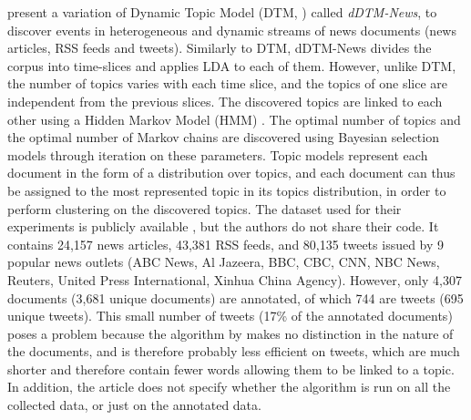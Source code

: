\cite{mele_linking_2017, mele2019event} present a variation of Dynamic Topic Model  (DTM, \citep{blei_dynamic_2006}) called \textit{dDTM-News}, to discover events in heterogeneous and dynamic streams of news documents (news articles, RSS feeds and tweets). Similarly to DTM, dDTM-News divides the corpus into time-slices and applies LDA to each of them. However, unlike DTM, the number of topics varies with each time slice, and the topics of one slice are independent from the previous slices. The discovered topics are linked to each other using a Hidden Markov Model (HMM) \citep{rabiner1989tutorial}. The optimal number of topics and the optimal number of Markov chains are discovered using Bayesian selection models through iteration on these parameters. Topic models represent each document in the form of a distribution over topics, and each document can thus be assigned to the most represented topic in its topics distribution, in order to perform clustering on the discovered topics. The dataset used for their experiments is publicly available \citep{mele2019multi}, but the authors do not share their code. It contains 24,157 news articles, 43,381 RSS feeds, and 80,135 tweets issued by 9 popular news outlets (ABC News, Al Jazeera, BBC, CBC, CNN, NBC News, Reuters, United Press International, Xinhua China Agency). However, only 4,307 documents (3,681 unique documents) are annotated, of which 744 are tweets (695 unique tweets). This small number of tweets (17\% of the annotated documents) poses a problem because the algorithm by \cite{mele_linking_2017, mele2019event} makes no distinction in the nature of the documents, and is therefore probably less efficient on tweets, which are much shorter and therefore contain fewer words allowing them to be linked to a topic.
In addition, the article does not specify whether the algorithm is run on all the collected data, or just on the annotated data. 

